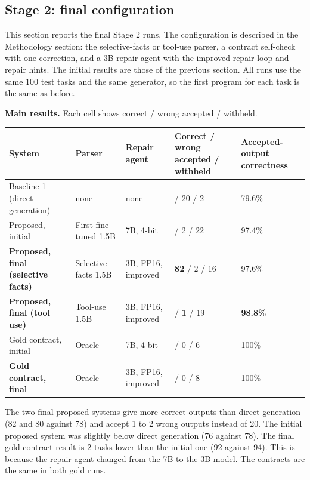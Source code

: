 \documentclass[11pt]{article}
\begin{document}
\subsection{Stage 2: final configuration}

This section reports the final Stage 2 runs. The configuration is
described in the Methodology section: the selective-facts or tool-use
parser, a contract self-check with one correction, and a 3B repair agent
with the improved repair loop and repair hints. The initial results are
those of the previous section. All runs use the same 100 test tasks and
the same generator, so the first program for each task is the same as
before.

\textbf{Main results.} Each cell shows correct / wrong accepted /
withheld.

\begin{table}[!tp]
\centering\scriptsize\setlength{\tabcolsep}{3pt}\renewcommand{\arraystretch}{1.1}
\begin{tabularx}{\textwidth}{>{\raggedright\arraybackslash}Xll>{\raggedright\arraybackslash}Xl}
\toprule
\textbf{System} & \textbf{Parser} & \textbf{Repair agent} & \textbf{Correct / wrong accepted / withheld} & \textbf{Accepted-output correctness} \\
\midrule
Baseline 1 (direct generation) & none & none & 78 / 20 / 2 & 79.6\% \\
Proposed, initial & First fine-tuned 1.5B & 7B, 4-bit & 76 / 2 / 22 & 97.4\% \\
\textbf{Proposed, final (selective facts)} & Selective-facts 1.5B & 3B, FP16, improved & \textbf{82} / 2 / 16 & 97.6\% \\
\textbf{Proposed, final (tool use)} & Tool-use 1.5B & 3B, FP16, improved & 80 / \textbf{1} / 19 & \textbf{98.8\%} \\
Gold contract, initial & Oracle & 7B, 4-bit & 94 / 0 / 6 & 100\% \\
\textbf{Gold contract, final} & Oracle & 3B, FP16, improved & 92 / 0 / 8 & 100\% \\
\bottomrule
\end{tabularx}
\end{table}

The two final proposed systems give more correct outputs than direct
generation (82 and 80 against 78) and accept 1 to 2 wrong outputs
instead of 20. The initial proposed system was slightly below direct
generation (76 against 78). The final gold-contract result is 2 tasks
lower than the initial one (92 against 94). This is because the repair
agent changed from the 7B to the 3B model. The contracts are the same in
both gold runs.
\end{document}
